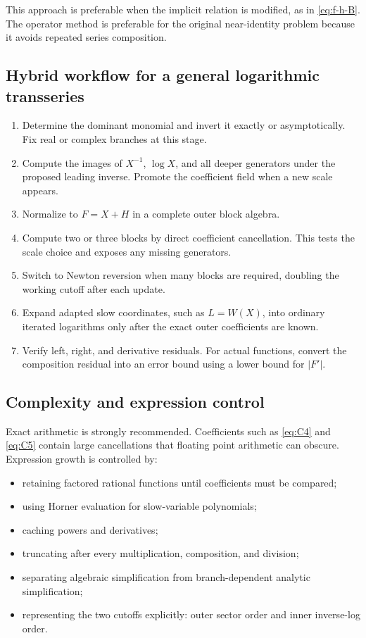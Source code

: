 \documentclass[11pt,a4paper]{article}
\numberwithin{equation}{section}
\theoremstyle{definition}
\theoremstyle{remark}
\begin{document}
This approach is preferable when the implicit relation is modified, as in
\eqref{eq:f-h-B}.  The operator method is preferable for the original
near-identity problem because it avoids repeated series composition.

\subsection{Hybrid workflow for a general logarithmic transseries}

\begin{methodbox}[title={Recommended reversal workflow}]
\begin{enumerate}
\item Determine the dominant monomial and invert it exactly or
      asymptotically.  Fix real or complex branches at this stage.
\item Compute the images of \(X^{-1}\), \(\log X\), and all deeper
      generators under the proposed leading inverse.  Promote the
      coefficient field when a new scale appears.
\item Normalize to \(F=X+H\) in a complete outer block algebra.
\item Compute two or three blocks by direct coefficient cancellation.
      This tests the scale choice and exposes any missing generators.
\item Switch to Newton reversion when many blocks are required, doubling
      the working cutoff after each update.
\item Expand adapted slow coordinates, such as \(L=W(X)\), into ordinary
      iterated logarithms only after the exact outer coefficients are known.
\item Verify left, right, and derivative residuals.  For actual functions,
      convert the composition residual into an error bound using a lower
      bound for \(|F'|\).
\end{enumerate}
\end{methodbox}

\subsection{Complexity and expression control}

Exact arithmetic is strongly recommended.  Coefficients such as
\eqref{eq:C4} and \eqref{eq:C5} contain large cancellations that floating
point arithmetic can obscure.  Expression growth is controlled by:
\begin{itemize}
\item retaining factored rational functions until coefficients must be
      compared;
\item using Horner evaluation for slow-variable polynomials;
\item caching powers and derivatives;
\item truncating after every multiplication, composition, and division;
\item separating algebraic simplification from branch-dependent analytic
      simplification;
\item representing the two cutoffs explicitly: outer sector order and
      inner inverse-log order.
\end{itemize}
\end{document}
